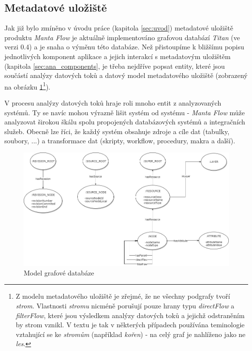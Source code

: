 \subsection{Metadatové uložiště}
\label{sec:ana_model}
Jak již bylo zmíněno v úvodu práce (kapitola \ref{sec:uvod}) metadatové uložiště produktu \textit{Manta Flow} je aktuálně implementováno grafovou databází \textit{Titan} (ve verzi 0.4) a je snaha o výměnu této databáze\cite{Kovar18}.
Než přistoupíme k bližšímu popisu jednotlivých komponent aplikace a jejich interakcí s metadatovým uložištěm (kapitola \ref{sec:ana_components}, je třeba nejdříve popsat entity, které jsou součástí analýzy datových toků a datový model metadatového uložiště (zobrazený na obrázku \ref{fig:ana-model}\footnote{Z modelu metadatového uložiště je zřejmé, že ne všechny podgrafy tvoří \textit{strom}. Vlastnosti \textit{stromu} nicméně porušují pouze hrany typu \textit{directFlow} a \textit{filterFlow}, které jsou výsledkem analýzy datových toků a jejichž odstraněním by strom vznikl. V textu je tak v některých případech používána teminologie vztahující se ke \textit{stromům} (například \textit{kořen}) - na celý graf je nahlíženo jako ne \textit{les}.}).

V procesu analýzy datových toků hraje roli mnoho entit z analyzovaných systémů. Ty se navíc mohou výrazně lišit systém od systému - \textit{Manta Flow} může analyzovat širokou škálu spolu propojených databázových systémů a integračních služeb. Obecně lze říci, že každý systém obsahuje zdroje a cíle dat (tabulky, soubory, ...) a transformace dat (skripty, \textit{} workflow, procedury, makra a další).

\begin{figure}
\begin{center}
\includegraphics[width=14cm]{figures/model}
\caption{Model grafové databáze}
\label{fig:ana-model}
\end{center}
\end{figure}

